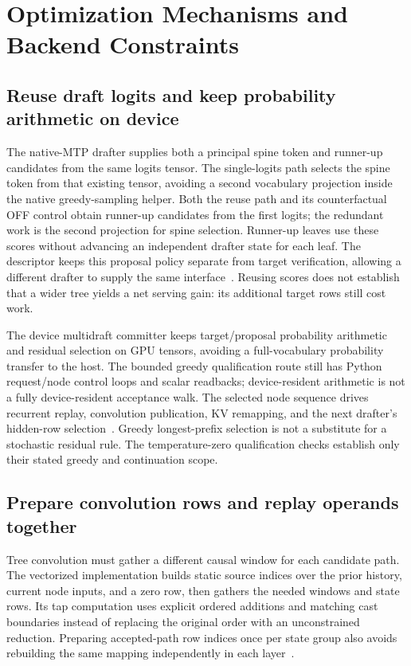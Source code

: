 \documentclass[conference]{IEEEtran}
\begin{document}
\section{Optimization Mechanisms and Backend Constraints}
\label{sec:optimization}
\subsection{Reuse draft logits and keep probability arithmetic on device}
The native-MTP drafter supplies both a principal spine token and runner-up candidates from the same logits tensor. The single-logits path selects the spine token from that existing tensor, avoiding a second vocabulary projection inside the native greedy-sampling helper. Both the reuse path and its counterfactual OFF control obtain runner-up candidates from the first logits; the redundant work is the second projection for spine selection. Runner-up leaves use these scores without advancing an independent drafter state for each leaf. The descriptor keeps this proposal policy separate from target verification, allowing a different drafter to supply the same interface~\cite{lumo2026archive}. Reusing scores does not establish that a wider tree yields a net serving gain: its additional target rows still cost work.

The device multidraft committer keeps target/proposal probability arithmetic and residual selection on GPU tensors, avoiding a full-vocabulary probability transfer to the host. The bounded greedy qualification route still has Python request/node control loops and scalar readbacks; device-resident arithmetic is not a fully device-resident acceptance walk. The selected node sequence drives recurrent replay, convolution publication, KV remapping, and the next drafter's hidden-row selection~\cite{lumo2026archive}. Greedy longest-prefix selection is not a substitute for a stochastic residual rule. The temperature-zero qualification checks establish only their stated greedy and continuation scope.

\subsection{Prepare convolution rows and replay operands together}
Tree convolution must gather a different causal window for each candidate path. The vectorized implementation builds static source indices over the prior history, current node inputs, and a zero row, then gathers the needed windows and state rows. Its tap computation uses explicit ordered additions and matching cast boundaries instead of replacing the original order with an unconstrained reduction. Preparing accepted-path row indices once per state group also avoids rebuilding the same mapping independently in each layer~\cite{lumo2026archive}.
\end{document}
